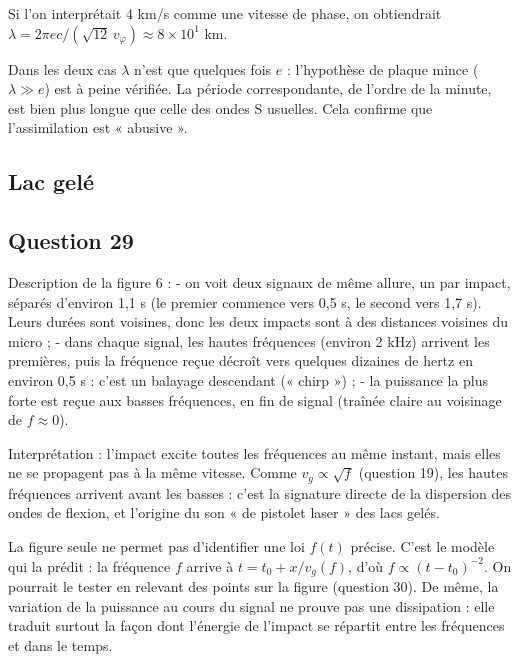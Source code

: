 \documentclass[11pt,a4paper]{article}
\newcommand{\equationajustee}[1]{%
  \sbox{\boiteequation}{$\displaystyle #1$}%
  \ifdim\wd\boiteequation>\linewidth
    \[\resizebox{\linewidth}{!}{\usebox{\boiteequation}}\]%
  \else
    \[#1\]%
  \fi}
\begin{document}
\equationajustee{\boxed{\lambda\approx1{,}6\times10^{5}\ \mathrm{m}\approx1{,}6\times10^{2}\ \mathrm{km}}}

Si l'on interprétait 4 km/s comme une vitesse de phase, on obtiendrait \(\lambda=2\pi ec/(\sqrt{12}\,v_\varphi)\approx8\times10^{1}\) km.

Dans les deux cas \(\lambda\) n'est que quelques fois \(e\) : l'hypothèse de plaque mince (\(\lambda\gg e\)) est à peine vérifiée. La période correspondante, de l'ordre de la minute, est bien plus longue que celle des ondes S usuelles. Cela confirme que l'assimilation est « abusive ».

\hypertarget{lac-geluxe9}{%
\subsection{Lac gelé}\label{lac-geluxe9}}

\hypertarget{question-29}{%
\subsection{Question 29}\label{question-29}}

Description de la figure 6 :
- on voit deux signaux de même allure, un par impact, séparés d'environ 1,1 s (le premier commence vers 0,5 s, le second vers 1,7 s). Leurs durées sont voisines, donc les deux impacts sont à des distances voisines du micro ;
- dans chaque signal, les hautes fréquences (environ 2 kHz) arrivent les premières, puis la fréquence reçue décroît vers quelques dizaines de hertz en environ 0,5 s : c'est un balayage descendant (« chirp ») ;
- la puissance la plus forte est reçue aux basses fréquences, en fin de signal (traînée claire au voisinage de \(f\approx0\)).

Interprétation : l'impact excite toutes les fréquences au même instant, mais elles ne se propagent pas à la même vitesse. Comme \(v_g\propto\sqrt f\) (question 19), les hautes fréquences arrivent avant les basses : c'est la signature directe de la dispersion des ondes de flexion, et l'origine du son « de pistolet laser » des lacs gelés.

La figure seule ne permet pas d'identifier une loi \(f(t)\) précise. C'est le modèle qui la prédit : la fréquence \(f\) arrive à \(t=t_0+x/v_g(f)\), d'où \(f\propto(t-t_0)^{-2}\). On pourrait le tester en relevant des points sur la figure (question 30). De même, la variation de la puissance au cours du signal ne prouve pas une dissipation : elle traduit surtout la façon dont l'énergie de l'impact se répartit entre les fréquences et dans le temps.
\end{document}
